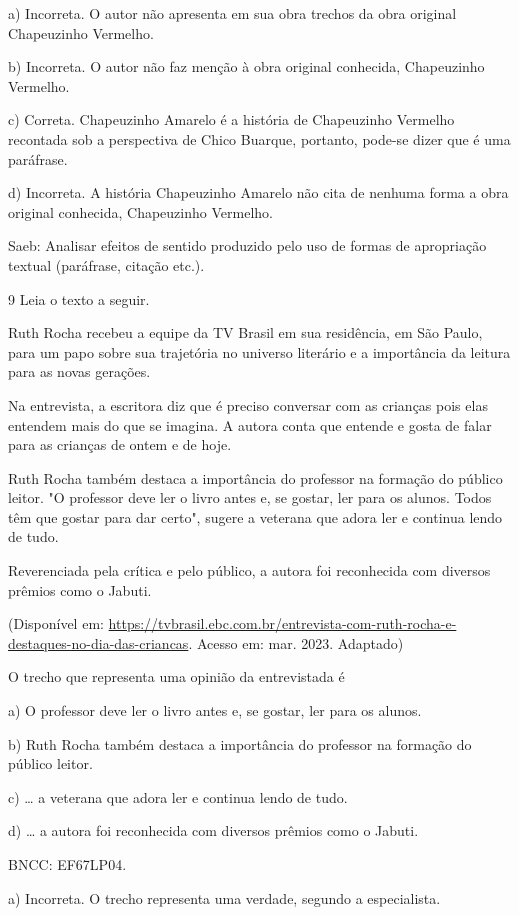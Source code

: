 a) Incorreta. O autor não apresenta em sua obra trechos da obra original
Chapeuzinho Vermelho.

b) Incorreta. O autor não faz menção à obra original conhecida,
Chapeuzinho Vermelho.

c) Correta. Chapeuzinho Amarelo é a história de Chapeuzinho Vermelho
recontada sob a perspectiva de Chico Buarque, portanto, pode-se dizer
que é uma paráfrase.

d) Incorreta. A história Chapeuzinho Amarelo não cita de nenhuma forma a
obra original conhecida, Chapeuzinho Vermelho.

Saeb: Analisar efeitos de sentido produzido pelo uso de formas de
apropriação textual (paráfrase, citação etc.).

\num{9} Leia o texto a seguir.

Ruth Rocha recebeu a equipe da TV Brasil em sua residência, em São
Paulo, para um papo sobre sua trajetória no universo literário e a
importância da leitura para as novas gerações.

Na entrevista, a escritora diz que é preciso conversar com as crianças
pois elas entendem mais do que se imagina. A autora conta que entende e
gosta de falar para as crianças de ontem e de hoje.

Ruth Rocha também destaca a importância do professor na formação do
público leitor. "O professor deve ler o livro antes e, se gostar, ler
para os alunos. Todos têm que gostar para dar certo", sugere a veterana
que adora ler e continua lendo de tudo.

Reverenciada pela crítica e pelo público, a autora foi reconhecida com
diversos prêmios como o Jabuti.

(Disponível em: 
\url{https://tvbrasil.ebc.com.br/entrevista-com-ruth-rocha-e-destaques-no-dia-das-criancas}.
Acesso em: mar. 2023. Adaptado)

O trecho que representa uma opinião da entrevistada é

a) O professor deve ler o livro antes e, se gostar, ler para os alunos.

b) Ruth Rocha também destaca a importância do professor na formação do
público leitor.

c) \ldots{} a veterana que adora ler e continua lendo de tudo.

d) \ldots{} a autora foi reconhecida com diversos prêmios como o Jabuti.

BNCC: EF67LP04.

a) Incorreta. O trecho representa uma verdade, segundo a especialista.

